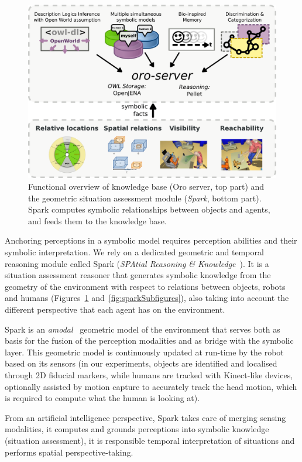 \documentclass[preprint,3p,times]{elsarticle}
\begin{document}
\begin{figure}
        \centering
        \includegraphics[width=0.8\columnwidth]{spark-oro.png}
    \caption{Functional overview of knowledge base ({\sc Oro} server, top part)
    and the geometric situation assessment module (\emph{{\sc Spark}}, bottom
    part). {\sc Spark} computes symbolic relationships between objects and
    agents, and feeds them to the knowledge base.}

        \label{fig|spark-oro}
\end{figure}

Anchoring perceptions in a symbolic model requires perception abilities and
their symbolic interpretation. We rely on a dedicated geometric and temporal
reasoning module called {\sc Spark} (\emph{SPAtial Reasoning \&
Knowledge}~\cite{Sisbot2011}). It is a situation assessment reasoner that
generates symbolic knowledge from the geometry of the environment with respect
to relations between objects, robots and humans (Figures~\ref{fig|spark-oro} and~\ref{fig:sparkSubfigures}),
also taking into account the different perspective that each agent has on the
environment.

{\sc Spark} is an \emph{amodal}~\cite{Mavridis2006} geometric model of the
environment that serves both as basis for the fusion of the perception
modalities and as bridge with the symbolic layer. This geometric model is
continuously updated at run-time by the robot based on its sensors (in our
experiments, objects are identified and localised through 2D fiducial markers, while
humans are tracked with Kinect-like devices, optionally assisted by motion
capture to accurately track the head motion, which is required to compute what
the human is looking at).

From an artificial intelligence perspective, {\sc Spark} takes care of merging
sensing modalities, it computes and grounds perceptions into symbolic
knowledge (situation assessment), it is responsible temporal interpretation of
situations and performs spatial perspective-taking.
\end{document}
